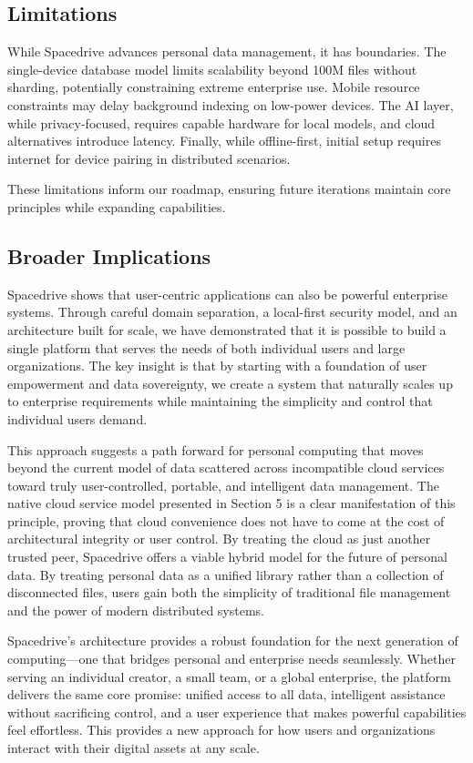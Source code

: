 \documentclass[sigconf]{acmart}
\begin{document}
\subsection{Limitations}
While Spacedrive advances personal data management, it has boundaries. The single-device database model limits scalability beyond 100M files without sharding, potentially constraining extreme enterprise use. Mobile resource constraints may delay background indexing on low-power devices. The AI layer, while privacy-focused, requires capable hardware for local models, and cloud alternatives introduce latency. Finally, while offline-first, initial setup requires internet for device pairing in distributed scenarios.

These limitations inform our roadmap, ensuring future iterations maintain core principles while expanding capabilities.

\subsection{Broader Implications}
Spacedrive shows that user-centric applications can also be powerful enterprise systems. Through careful domain separation, a local-first security model, and an architecture built for scale, we have demonstrated that it is possible to build a single platform that serves the needs of both individual users and large organizations. The key insight is that by starting with a foundation of user empowerment and data sovereignty, we create a system that naturally scales up to enterprise requirements while maintaining the simplicity and control that individual users demand.

This approach suggests a path forward for personal computing that moves beyond the current model of data scattered across incompatible cloud services toward truly user-controlled, portable, and intelligent data management. The native cloud service model presented in Section 5 is a clear manifestation of this principle, proving that cloud convenience does not have to come at the cost of architectural integrity or user control. By treating the cloud as just another trusted peer, Spacedrive offers a viable hybrid model for the future of personal data. By treating personal data as a unified library rather than a collection of disconnected files, users gain both the simplicity of traditional file management and the power of modern distributed systems.

Spacedrive's architecture provides a robust foundation for the next generation of computing---one that bridges personal and enterprise needs seamlessly. Whether serving an individual creator, a small team, or a global enterprise, the platform delivers the same core promise: unified access to all data, intelligent assistance without sacrificing control, and a user experience that makes powerful capabilities feel effortless. This provides a new approach for how users and organizations interact with their digital assets at any scale.
\end{document}
